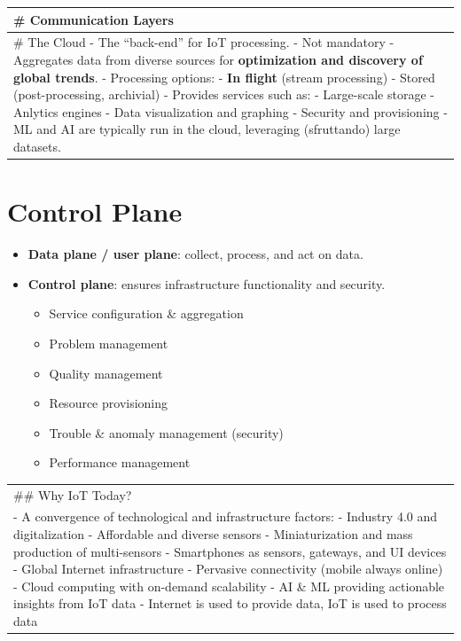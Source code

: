 \documentclass[a4paper, 12pt]{book} %
\begin{document}
\begin{longtable}[]{@{}
  >{\raggedright\arraybackslash}p{}@{}}
\toprule\noalign{}
\begin{minipage}[b]{\linewidth}\raggedright
\# Communication Layers
\end{minipage} \\
\midrule\noalign{}
\endhead
\bottomrule\noalign{}
\endlastfoot
\# The Cloud - The ``back-end'' for IoT processing. - Not mandatory -
Aggregates data from diverse sources for \textbf{optimization and
discovery of global trends}. - Processing options: - \textbf{In flight}
(stream processing) - Stored (post-processing, archivial) - Provides
services such as: - Large-scale storage - Anlytics engines - Data
visualization and graphing - Security and provisioning - ML and AI are
typically run in the cloud, leveraging (sfruttando) large datasets. \\
\end{longtable}

\chapter{Control Plane}\label{control-plane}

\begin{itemize}
\tightlist
\item
  \textbf{Data plane / user plane}: collect, process, and act on data.
\item
  \textbf{Control plane}: ensures infrastructure functionality and
  security.

  \begin{itemize}
  \tightlist
  \item
    Service configuration \& aggregation
  \item
    Problem management
  \item
    Quality management
  \item
    Resource provisioning
  \item
    Trouble \& anomaly management (security)
  \item
    Performance management
  \end{itemize}
\end{itemize}

\begin{longtable}[]{@{}
  >{\raggedright\arraybackslash}p{}@{}}
\toprule\noalign{}
\endhead
\bottomrule\noalign{}
\endlastfoot
\#\# Why IoT Today? \\
- A convergence of technological and infrastructure factors: - Industry
4.0 and digitalization - Affordable and diverse sensors -
Miniaturization and mass production of multi-sensors - Smartphones as
sensors, gateways, and UI devices - Global Internet infrastructure -
Pervasive connectivity (mobile always online) - Cloud computing with
on-demand scalability - AI \& ML providing actionable insights from IoT
data - Internet is used to provide data, IoT is used to process data \\
\end{longtable}
\end{document}

